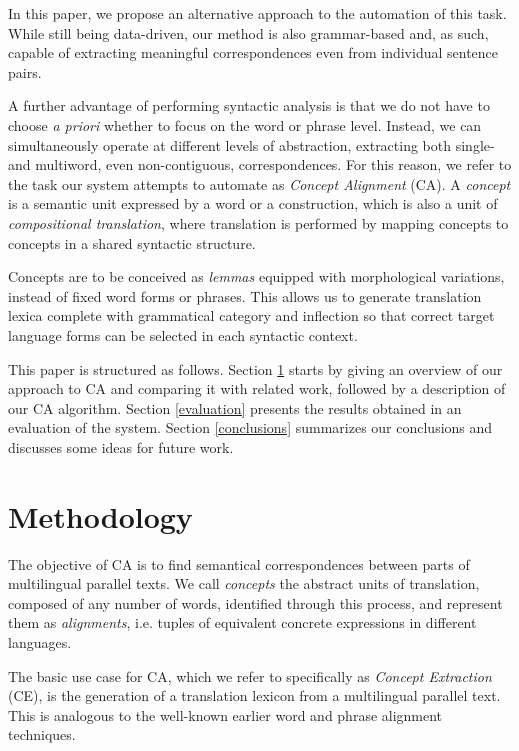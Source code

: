 \documentclass[11pt]{article}
\begin{document}
In this paper, we propose an alternative approach to the automation of this task. 
While still being data-driven, our method is also grammar-based and, as such, capable of extracting meaningful correspondences even from individual sentence pairs. 

A further advantage of performing syntactic analysis is that we do not have to choose \textit{a priori} whether to focus on the word or phrase level. 
Instead, we can simultaneously operate at different levels of abstraction, extracting both single- and multiword, even non-contiguous, correspondences. 
For this reason, we refer to the task our system attempts to automate as \textit{Concept Alignment} (CA). 
A \textit{concept} is a semantic unit expressed by a word or a construction, which is also a unit of \textit{compositional translation}, where translation is performed by mapping concepts to concepts in a shared syntactic structure.

Concepts are to be conceived as \textit{lemmas} equipped with morphological variations, instead of fixed word forms or phrases.
This  allows us to generate translation lexica complete with grammatical category and inflection so that correct target language forms can be selected in each syntactic context.

This paper is structured as follows. 
Section \ref{methodology} starts by giving an overview of our approach to CA and comparing it with related work, followed by a description of our CA algorithm.
Section \ref{evaluation} presents the results obtained in an evaluation of the system.
Section \ref{conclusions} summarizes our conclusions and discusses some ideas for future work. 

\section{Methodology} \label{methodology}
The objective of CA is to find semantical correspondences between parts of multilingual parallel texts. 
We call \textit{concepts} the abstract units of translation, composed of any number of words, identified through this process, and represent them as \textit{alignments}, i.e. tuples of equivalent concrete expressions in different languages.

The basic use case for CA, which we refer to specifically as \textit{Concept Extraction} (CE), is the generation of a translation lexicon from a multilingual parallel text.
This is analogous to the well-known earlier word and phrase alignment techniques. 
\end{document}
